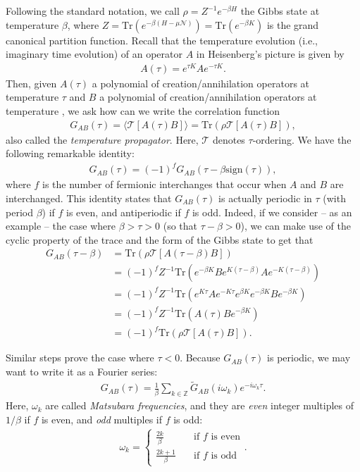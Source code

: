 \begin{appendices}
Following the standard notation, we call $\rho = Z^{-1}e^{-\beta H}$ the Gibbs state at
temperature $\beta$, where $Z = \mathrm{Tr}(e^{-\beta(H-\mu\mathcal{N})}) = \mathrm{Tr}(
e^{-\beta K})$ is the grand canonical partition function. Recall that the temperature
evolution (i.e., imaginary time evolution) of an operator $A$ in Heisenberg's picture is given
by
\begin{align*}
	A(\tau) = e^{\tau K} A e^{-\tau K}.
\end{align*}
Then, given $A(\tau)$ a polynomial of creation/annihilation operators at temperature $\tau$
and $B$ a polynomial of creation/annihilation operators at temperature \beta, we ask how can
we write the correlation function
\begin{align*}
	G_{AB}(\tau) = \langle \mathcal{T}[A(\tau)B]\rangle = \mathrm{Tr}(\rho \mathcal{T}[A(\tau)B]),
\end{align*}
also called the \textit{temperature propagator}. Here, $\mathcal{T}$ denotes $\tau$-ordering.
We have the following remarkable identity:
\begin{align*}
	G_{AB}(\tau) = (-1)^f G_{AB}(\tau - \beta\mathrm{sign}(\tau)),
\end{align*}
where $f$ is the number of fermionic interchanges that occur when $A$ and $B$ are interchanged.
This identity states that $G_{AB}(\tau)$ is actually periodic in $\tau$ (with period $\beta$)
if $f$ is even, and antiperiodic if $f$ is odd. Indeed, if we consider -- as an example -- the
case where $\beta>\tau>0$ (so that $\tau-\beta>0$), we can make use of the cyclic property of
the trace and the form of the Gibbs state to get that
\begin{align*}
	G_{AB}(\tau-\beta)
	&= \mathrm{Tr}(\rho\mathcal{T}[A(\tau-\beta)B])\\
	&= (-1)^f Z^{-1} \mathrm{Tr}(e^{-\beta K}Be^{K(\tau-\beta)}Ae^{-K(\tau-\beta)})\\
	&= (-1)^f Z^{-1} \mathrm{Tr}(e^{K\tau}Ae^{-K\tau}e^{\beta K}e^{-\beta K}Be^{-\beta K})\\
	&= (-1)^f Z^{-1} \mathrm{Tr}(A(\tau)Be^{-\beta K})\\
	&= (-1)^f \mathrm{Tr}(\rho\mathcal{T}[A(\tau)B]).
\end{align*}

Similar steps prove the case where $\tau<0$. Because $G_{AB}(\tau)$ is periodic, we may want
to write it as a Fourier series:
\begin{align*}
	G_{AB}(\tau) = \frac{1}{\beta} \sum_{k\in\mathbb{Z}}\tilde{G}_{AB}(i\omega_k) e^{-i\omega_k \tau}.
\end{align*}
Here, $\omega_k$ are called \textit{Matsubara frequencies}, and they are \textit{even} integer
multiples of $1/\beta$ if $f$ is even, and \textit{odd} multiples if $f$ is odd:
\begin{align*}
	\omega_k = \begin{cases}
		\frac{2k}{\beta}&\quad\text{if $f$ is even}\\
		\frac{2k+1}{\beta}&\quad\text{if $f$ is odd}
	\end{cases}.
\end{align*}


\end{appendices}
